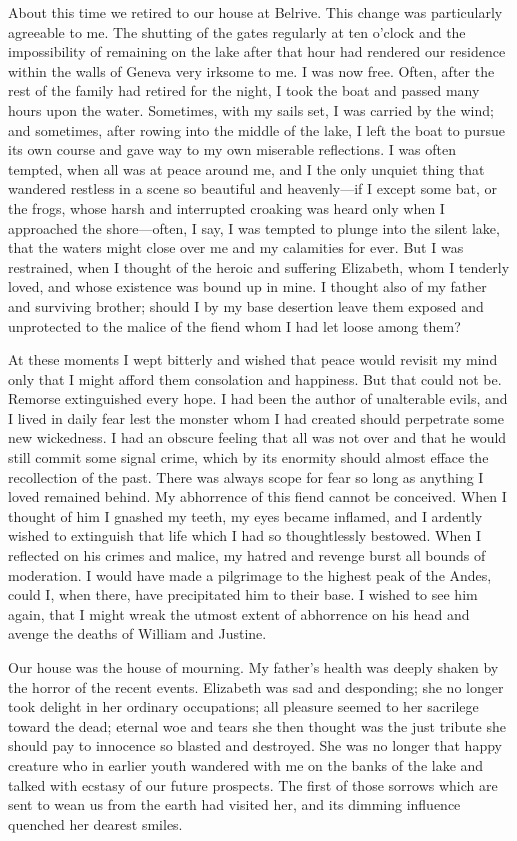 \documentclass[12pt,openright]{book}
\begin{document}
About this time we retired to our house at Belrive. This change was particularly agreeable to me. The shutting of the gates regularly at ten o’clock and the impossibility of remaining on the lake after that hour had rendered our residence within the walls of Geneva very irksome to me. I was now free. Often, after the rest of the family had retired for the night, I took the boat and passed many hours upon the water. Sometimes, with my sails set, I was carried by the wind; and sometimes, after rowing into the middle of the lake, I left the boat to pursue its own course and gave way to my own miserable reflections. I was often tempted, when all was at peace around me, and I the only unquiet thing that wandered restless in a scene so beautiful and heavenly—if I except some bat, or the frogs, whose harsh and interrupted croaking was heard only when I approached the shore—often, I say, I was tempted to plunge into the silent lake, that the waters might close over me and my calamities for ever. But I was restrained, when I thought of the heroic and suffering Elizabeth, whom I tenderly loved, and whose existence was bound up in mine. I thought also of my father and surviving brother; should I by my base desertion leave them exposed and unprotected to the malice of the fiend whom I had let loose among them?

At these moments I wept bitterly and wished that peace would revisit my mind only that I might afford them consolation and happiness. But that could not be. Remorse extinguished every hope. I had been the author of unalterable evils, and I lived in daily fear lest the monster whom I had created should perpetrate some new wickedness. I had an obscure feeling that all was not over and that he would still commit some signal crime, which by its enormity should almost efface the recollection of the past. There was always scope for fear so long as anything I loved remained behind. My abhorrence of this fiend cannot be conceived. When I thought of him I gnashed my teeth, my eyes became inflamed, and I ardently wished to extinguish that life which I had so thoughtlessly bestowed. When I reflected on his crimes and malice, my hatred and revenge burst all bounds of moderation. I would have made a pilgrimage to the highest peak of the Andes, could I, when there, have precipitated him to their base. I wished to see him again, that I might wreak the utmost extent of abhorrence on his head and avenge the deaths of William and Justine.

Our house was the house of mourning. My father’s health was deeply shaken by the horror of the recent events. Elizabeth was sad and desponding; she no longer took delight in her ordinary occupations; all pleasure seemed to her sacrilege toward the dead; eternal woe and tears she then thought was the just tribute she should pay to innocence so blasted and destroyed. She was no longer that happy creature who in earlier youth wandered with me on the banks of the lake and talked with ecstasy of our future prospects. The first of those sorrows which are sent to wean us from the earth had visited her, and its dimming influence quenched her dearest smiles.
\end{document}
